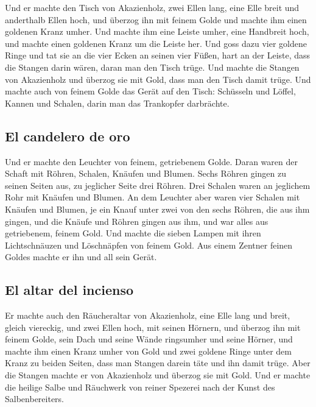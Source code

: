  Und er machte den Tisch von Akazienholz, zwei Ellen
lang, eine Elle breit und anderthalb Ellen hoch,  und
überzog ihn mit feinem Golde und machte ihm einen goldenen Kranz umher.
 Und machte ihm eine Leiste umher, eine Handbreit hoch,
und machte einen goldenen Kranz um die Leiste her.  Und
goss dazu vier goldene Ringe und tat sie an die vier Ecken an seinen
vier Füßen,  hart an der Leiste, dass die Stangen darin
wären, daran man den Tisch trüge.  Und machte die Stangen
von Akazienholz und überzog sie mit Gold, dass man den Tisch damit
trüge.  Und machte auch von feinem Golde das Gerät auf
den Tisch: Schüsseln und Löffel, Kannen und Schalen, darin man das
Trankopfer darbrächte.

\hypertarget{el-candelero-de-oro}{%
\subsection{El candelero de oro}\label{el-candelero-de-oro}}

 Und er machte den Leuchter von feinem, getriebenem
Golde. Daran waren der Schaft mit Röhren, Schalen, Knäufen und Blumen.
 Sechs Röhren gingen zu seinen Seiten aus, zu jeglicher
Seite drei Röhren.  Drei Schalen waren an jeglichem Rohr
mit Knäufen und Blumen.  An dem Leuchter aber waren vier
Schalen mit Knäufen und Blumen,  je ein Knauf unter zwei
von den sechs Röhren, die aus ihm gingen,  und die Knäufe
und Röhren gingen aus ihm, und war alles aus getriebenem, feinem Gold.
 Und machte die sieben Lampen mit ihren Lichtschnäuzen
und Löschnäpfen von feinem Gold.  Aus einem Zentner
feinen Goldes machte er ihn und all sein Gerät.

\hypertarget{el-altar-del-incienso}{%
\subsection{El altar del incienso}\label{el-altar-del-incienso}}

 Er machte auch den Räucheraltar von Akazienholz, eine
Elle lang und breit, gleich viereckig, und zwei Ellen hoch, mit seinen
Hörnern,  und überzog ihn mit feinem Golde, sein Dach und
seine Wände ringsumher und seine Hörner, und machte ihm einen Kranz
umher von Gold  und zwei goldene Ringe unter dem Kranz zu
beiden Seiten, dass man Stangen darein täte und ihn damit trüge.
 Aber die Stangen machte er von Akazienholz und überzog
sie mit Gold.  Und er machte die heilige Salbe und
Räuchwerk von reiner Spezerei nach der Kunst des Salbenbereiters.

